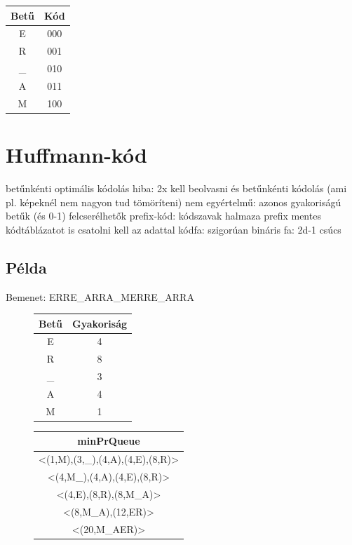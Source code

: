 \documentclass[12pt,a4paper]{article}
\begin{document}
\begin{table}[h!]
	\begin{tabular}{|c|c|}
		\hline
		\textbf{Betű} & \textbf{Kód} \\
		\hline
		E & 000 \\
		\hline
		R & 001 \\
		\hline
		\_ & 010 \\
		\hline
		A & 011 \\
		\hline
		M & 100 \\
		\hline
	\end{tabular}
\end{table}

\pagebreak

\section{Huffmann-kód}

\begin{outline}
	\1 betűnkénti optimális kódolás
	 hiba: 2x kell beolvasni és betűnkénti kódolás (ami pl. képeknél nem nagyon tud tömöríteni)
	\1 nem egyértelmű: azonos gyakoriságú betűk (és 0-1) felcserélhetők
	\1 prefix-kód: kódszavak halmaza prefix mentes
	\1 kódtáblázatot is csatolni kell az adattal
	\1 kódfa: szigorúan bináris fa: 2d-1 csúcs
\end{outline}

\subsection{Példa}

Bemenet: ERRE\_ARRA\_MERRE\_ARRA

\begin{figure}[h]
	\begin{minipage}{.5\textwidth}
		\begin{tabular}{|c|c|}
			\hline
			\textbf{Betű} & \textbf{Gyakoriság} \\
			\hline
			E & 4 \\
			\hline
			R & 8 \\
			\hline
			\_ & 3 \\
			\hline
			A & 4 \\
			\hline
			M & 1 \\
			\hline
		\end{tabular}
	\end{minipage}
	\begin{minipage}{.5\textwidth}
		\begin{tabular}{|c|}
			\hline
			\textbf{minPrQueue} \\
			\hline
			<(1,M),(3,\_),(4,A),(4,E),(8,R)> \\
			\hline
			<(4,M\_),(4,A),(4,E),(8,R)> \\
			\hline
			<(4,E),(8,R),(8,M\_A)> \\
			\hline
			<(8,M\_A),(12,ER)> \\
			\hline
			<(20,M\_AER)> \\
			\hline
		\end{tabular}
	\end{minipage}
\end{figure}
\end{document}
